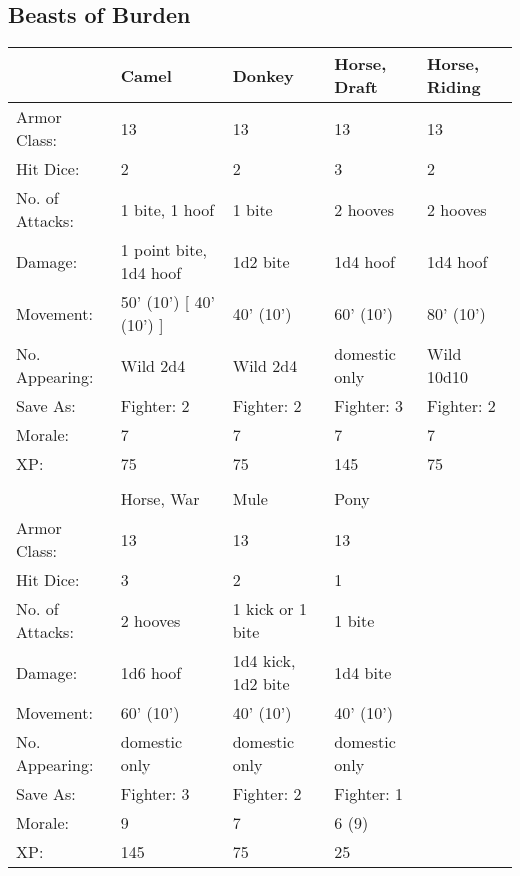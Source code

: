 \documentclass[a4paper,twoside,openany,10pt]{book}
\begin{document}
\subsection{Beasts of Burden}\label{beasts-of-burden-1}

\begin{tabular*}{1\linewidth}{@{\extracolsep{\fill}}lllll}

& \textbf{Camel} & \textbf{Donkey} & \textbf{Horse, Draft} & \textbf{Horse, Riding} \\\hline
Armor Class: & 13 & 13 & 13 & 13 \\\hline
Hit Dice: & 2 & 2 & 3 & 2 \\\hline
No. of Attacks: & 1 bite, 1 hoof & 1 bite & 2 hooves & 2 hooves \\\hline
Damage: & 1 point bite, 1d4 hoof & 1d2 bite & 1d4 hoof & 1d4 hoof \\\hline
Movement: & 50' (10') {[}
40' (10') {]} & 40'
(10') & 60' (10') &
80' (10') \\\hline
No. Appearing: & Wild 2d4 & Wild 2d4 & domestic only & Wild 10d10 \\\hline
Save As: & Fighter: 2 & Fighter: 2 & Fighter: 3 & Fighter: 2 \\\hline
Morale: & 7 & 7 & 7 & 7 \\\hline
XP: & 75 & 75 & 145 & 75 \\\hline
& & & & \\\hline
& Horse, War & Mule & Pony & \\\hline
Armor Class: & 13 & 13 & 13 & \\\hline
Hit Dice: & 3 & 2 & 1 & \\\hline
No. of Attacks: & 2 hooves & 1 kick or 1 bite & 1 bite & \\\hline
Damage: & 1d6 hoof & 1d4 kick, 1d2 bite & 1d4 bite & \\\hline
Movement: & 60' (10') &
40' (10') & 40'
(10') & \\\hline
No. Appearing: & domestic only & domestic only & domestic only & \\\hline
Save As: & Fighter: 3 & Fighter: 2 & Fighter: 1 & \\\hline
Morale: & 9 & 7 & 6 (9) & \\\hline
XP: & 145 & 75 & 25 & \\\hline
\end{tabular*}\\\medskip
\end{document}
